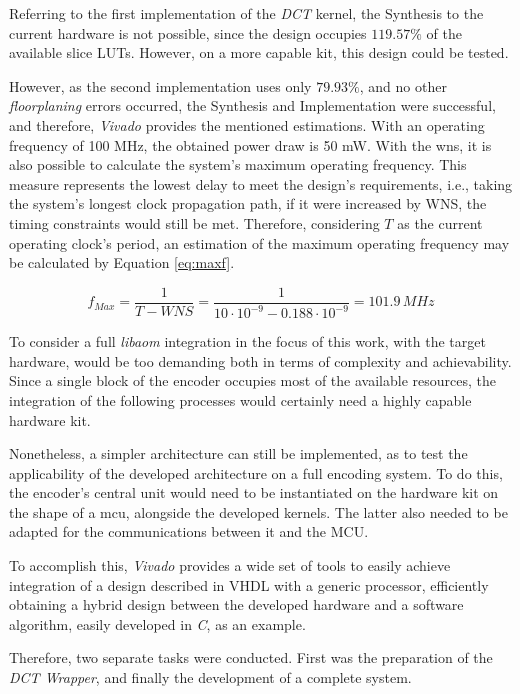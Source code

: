 Referring to the first implementation of the \emph{DCT} kernel, the Synthesis to the current hardware is not possible, since the design occupies $119.57\%$ of the available slice LUTs. However, on a more capable kit, this design could be tested.

However, as the second implementation uses only $79.93\%$, and no other \emph{floorplaning} errors occurred, the Synthesis and Implementation were successful, and therefore, \emph{Vivado} provides the mentioned estimations. With an operating frequency of 100 MHz, the obtained power draw is 50 mW. With the \gls{wns}, it is also possible to calculate the system's maximum operating frequency. This measure represents the lowest delay to meet the design's requirements, i.e., taking the system's longest clock propagation path, if it were increased by WNS, the timing constraints would still be met. Therefore, considering $T$ as the current operating clock's period, an estimation of the maximum operating frequency may be calculated by Equation \ref{eq:maxf}.

\begin{equation} \label{eq:maxf}
    f_{Max} = \frac{1}{T-WNS} = \frac{1}{10\cdot 10^{-9} - 0.188\cdot 10^{-9}} = 101.9\,MHz
\end{equation}

To consider a full \emph{libaom} integration in the focus of this work, with the target hardware, would be too demanding both in terms of complexity and achievability. Since a single block of the encoder occupies most of the available resources, the integration of the following processes would certainly need a highly capable hardware kit. 

Nonetheless, a simpler architecture can still be implemented, as to test the applicability of the developed architecture on a full encoding system. To do this, the encoder's central unit would need to be instantiated on the hardware kit on the shape of a \gls{mcu}, alongside the developed kernels. The latter also needed to be adapted for the communications between it and the MCU.

To accomplish this, \emph{Vivado} provides a wide set of tools to easily achieve integration of a design described in VHDL with a generic processor, efficiently obtaining a hybrid design between the developed hardware and a software algorithm, easily developed in \emph{C}, as an example.

Therefore, two separate tasks were conducted. First was the preparation of the \emph{DCT Wrapper}, and finally the development of a complete system.

